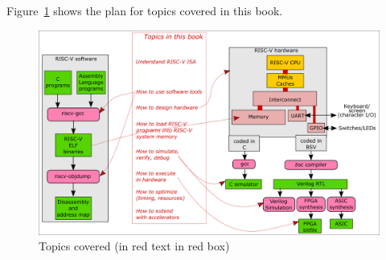 Figure~\ref{fig_Topics} shows the plan for topics covered in this book.
\begin{figure}[htbp]
  \centerline{\includegraphics[width=6in,angle=0]{ch010_intro/Figures/fig_Topics}}
  \caption{\label{fig_Topics}Topics covered (in red text in red box)}
\end{figure}

